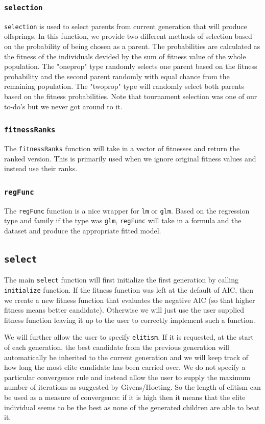 \documentclass{article}\usepackage[]{graphicx}\usepackage[]{color}
\begin{document}
\subsubsection{\texttt{selection}}
\texttt{selection} is used to select parents from current generation that will produce offsprings. In this function, we provide two different methods of selection based on the probability of being chosen as a parent. The probabilities are calculated as the fitness of the individuals devided by the sum of fitness value of the whole population. The "oneprop" type randomly selects one parent based on the fitness probability and the second parent randomly with equal chance from the remaining population. The "twoprop" type will randomly select both parents based on the fitness probabilities. Note that tournament selection was one of our to-do's but we never got around to it.

\subsubsection{\texttt{fitnessRanks}}
The \texttt{fitnessRanks} function will take in a vector of fitnesses and return the ranked version. This is primarily used when we ignore original fitness values and instead use their ranks.

\subsubsection{\texttt{regFunc}}
The \texttt{regFunc} function is a nice wrapper for \texttt{lm} or \texttt{glm}. Based on the regression type and family if the type was \texttt{glm}, \texttt{regFunc} will take in a formula and the dataset and produce the appropriate fitted model.

\subsection{\texttt{select}}
The main \texttt{select} function will first initialize the first generation by calling \texttt{initialize} function. If the fitness function was left at the default of AIC, then we create a new fitness function that evaluates the negative AIC (so that higher fitness means better candidate). Otherwise we will just use the user supplied fitness function leaving it up to the user to correctly implement such a function.

We will further allow the user to specify \texttt{elitism}. If it is requested, at the start of each generation, the best candidate from the previous generation will automatically be inherited to the current generation and we will keep track of how long the most elite candidate has been carried over. We do not specify a particular convergence rule and instead allow the user to supply the maximum number of iterations as suggested by Givens/Hoeting. So the length of elitism can be used as a measure of convergence: if it is high then it means that the elite individual seems to be the best as none of the generated children are able to beat it.
\end{document}
